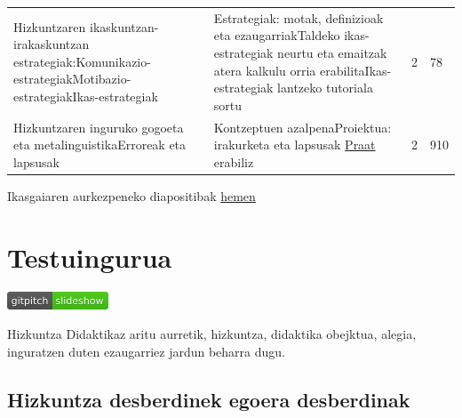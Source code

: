 \documentclass[]{book}
\begin{document}
\begin{longtable}[]{@{}llll@{}}
\begin{minipage}[t]{0.36\columnwidth}
Hizkuntzaren ikaskuntzan-irakaskuntzan estrategiak:Komunikazio-estrategiakMotibazio-estrategiakIkas-estrategiak\strut
\end{minipage} & \begin{minipage}[t]{0.36\columnwidth}\raggedright
Estrategiak: motak, definizioak eta ezaugarriakTaldeko ikas-estrategiak neurtu eta emaitzak atera kalkulu orria erabilitaIkas-estrategiak lantzeko tutoriala sortu\strut
\end{minipage} & \begin{minipage}[t]{0.02\columnwidth}\raggedright
2\strut
\end{minipage} & \begin{minipage}[t]{0.14\columnwidth}\raggedright
78\strut
\end{minipage}\tabularnewline
\begin{minipage}[t]{0.36\columnwidth}\raggedright
Hizkuntzaren inguruko gogoeta eta metalinguistikaErroreak eta lapsusak\strut
\end{minipage} & \begin{minipage}[t]{0.36\columnwidth}\raggedright
Kontzeptuen azalpenaProiektua: irakurketa eta lapsusak \href{http://www.praat.org}{Praat} erabiliz\strut
\end{minipage} & \begin{minipage}[t]{0.02\columnwidth}\raggedright
2\strut
\end{minipage} & \begin{minipage}[t]{0.14\columnwidth}\raggedright
910\strut
\end{minipage}\tabularnewline
\bottomrule
\end{longtable}

Ikasgaiaren aurkezpeneko diapositibak \href{https://gitpitch.com/JuanAbasolo/HD/}{hemen}

\hypertarget{testuingurua}{%
\chapter{Testuingurua}\label{testuingurua}}

\href{../Diapoak/01_Diap-testuingurua.html}{\includegraphics{assets/badge.png}}

Hizkuntza Didaktikaz aritu aurretik, hizkuntza, didaktika obejktua, alegia, inguratzen duten ezaugarriez jardun beharra dugu.

\hypertarget{hizkuntza-desberdinek-egoera-desberdinak}{%
\section{Hizkuntza desberdinek egoera desberdinak}\label{hizkuntza-desberdinek-egoera-desberdinak}}
\end{document}
